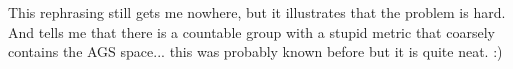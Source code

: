 \documentclass[11pt,a4paper]{amsart}
\theoremstyle{plain}
\theoremstyle{definition}%
\theoremstyle{remark}%
\begin{document}
This rephrasing still gets me nowhere, but it illustrates that the problem is hard. And tells me that there is a countable group with a stupid metric that coarsely contains the AGS space... this was probably known before but it is quite neat. :)



\end{document}
